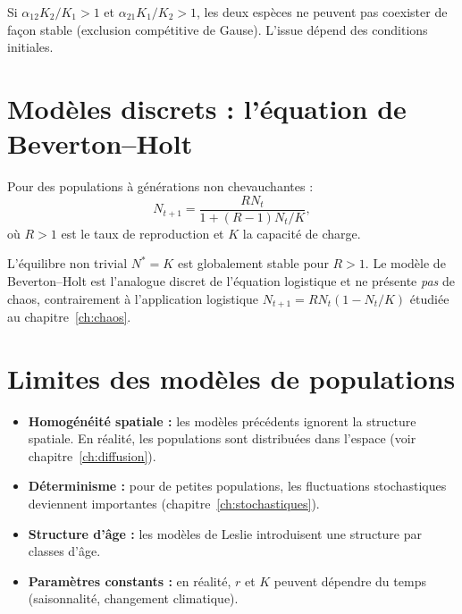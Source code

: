\begin{proposition}
Si $\alpha_{12}K_2/K_1 > 1$ et $\alpha_{21}K_1/K_2 > 1$, les deux
esp\`eces ne peuvent pas coexister de fa\c{c}on stable (exclusion
comp\'etitive de Gause).  L'issue d\'epend des conditions initiales.
\end{proposition}

\section{Mod\`eles discrets : l'\'equation de Beverton--Holt}

\begin{definition}
Pour des populations \`a g\'en\'erations non chevauchantes :
\[
  N_{t+1} = \frac{RN_t}{1 + (R-1)N_t/K},
\]
o\`u $R>1$ est le taux de reproduction et $K$ la capacit\'e de charge.
\end{definition}

\begin{proposition}
L'\'equilibre non trivial $N^*=K$ est globalement stable pour $R>1$.
Le mod\`ele de Beverton--Holt est l'analogue discret de l'\'equation
logistique et ne pr\'esente \emph{pas} de chaos, contrairement \`a
l'application logistique $N_{t+1}=RN_t(1-N_t/K)$ \'etudi\'ee au
chapitre~\ref{ch:chaos}.
\end{proposition}

\section{Limites des mod\`eles de populations}

\begin{attention}[title=\textbf{Hypoth\`eses et limites}]
\begin{itemize}
  \item \textbf{Homog\'en\'eit\'e spatiale :} les mod\`eles pr\'ec\'edents
    ignorent la structure spatiale. En r\'ealit\'e, les populations sont
    distribu\'ees dans l'espace (voir chapitre~\ref{ch:diffusion}).
  \item \textbf{D\'eterminisme :} pour de petites populations,
    les fluctuations stochastiques deviennent importantes
    (chapitre~\ref{ch:stochastiques}).
  \item \textbf{Structure d'\^age :} les mod\`eles de Leslie introduisent
    une structure par classes d'\^age.
  \item \textbf{Param\`etres constants :} en r\'ealit\'e, $r$ et $K$
    peuvent d\'ependre du temps (saisonnalit\'e, changement climatique).
\end{itemize}
\end{attention}

